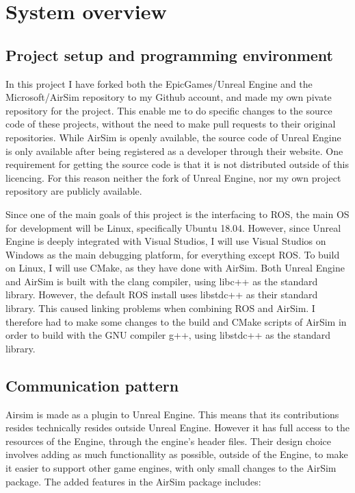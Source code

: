 \section{System overview}

\subsection{Project setup and programming environment}

In this project I have forked both the EpicGames/Unreal Engine and the Microsoft/AirSim repository to my Github account, and made my own pivate repository for the project. This enable me to do specific changes to the source code of these projects, without the need to make pull requests to their original repositories. While AirSim is openly available, the source code of Unreal Engine is only available after being registered as a developer through their website. One requirement for getting the source code is that it is not distributed outside of this licencing. For this reason neither the fork of Unreal Engine, nor my own project repository are publicly available.

Since one of the main goals of this project is the interfacing to ROS, the main OS for development will be Linux, specifically Ubuntu 18.04. However, since Unreal Engine is deeply integrated with Visual Studios, I will use Visual Studios on Windows as the main debugging platform, for everything except ROS. To build on Linux, I will use CMake, as they have done with AirSim. Both Unreal Engine and AirSim is built with the clang compiler, using libc++ as the standard library. However, the default ROS install uses libstdc++ as their standard library. This caused linking problems when combining ROS and AirSim. I therefore had to make some changes to the build and CMake scripts of AirSim in order to build with the GNU compiler g++, using libstdc++ as the standard library.


\subsection{Communication pattern}

Airsim is made as a plugin to Unreal Engine. This means that its contributions resides technically resides outside Unreal Engine. However it has full access to the resources of the Engine, through the engine's header files. Their design choice involves adding as much functionallity as possible, outside of the Engine, to make it easier to support other game engines, with only small changes to the AirSim package. The added features in the AirSim package includes:

